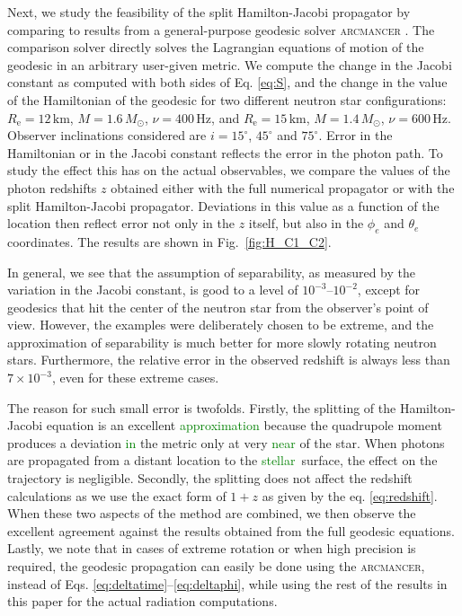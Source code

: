 \documentclass{aa}
\newcommand{\refe}[1]{\textcolor{green}{{#1}}}
\newcommand{\refedel}[1]{}
\newcommand{\Msun}{\ensuremath{M_{\odot}}}
\begin{document}
Next, we study the feasibility of the split Hamilton-Jacobi propagator by comparing to results from a general-purpose geodesic solver \textsc{arcmancer} \citep{PRJ16}.
The comparison solver directly solves the Lagrangian equations of motion of the geodesic in an arbitrary user-given metric. 
We compute the change in the Jacobi constant as computed with both sides of Eq. \eqref{eq:S}, and the change in the value of the Hamiltonian of the geodesic for two different neutron star configurations:
$R_{\mathrm{e}}=12\,\mathrm{km}$, $M=1.6\,\Msun$, $\nu=400\,\mathrm{Hz}$, and $R_{\mathrm{e}}=15\,\mathrm{km}$, $M=1.4\,\Msun$, $\nu=600\,\mathrm{Hz}$.
Observer inclinations considered are $i=15^\circ$, $45^\circ$ and $75^\circ$.
Error in the Hamiltonian or in the Jacobi constant reflects the error in the photon path.
To study the effect this has on the actual observables, we compare the values of the photon redshifts $z$ obtained either with the full numerical propagator or with the split Hamilton-Jacobi propagator.
Deviations in this value as a function of the location then reflect error not only in the $z$ itself, but also in the $\phi_e$ and $\theta_e$ coordinates.
The results are shown in Fig.~\ref{fig:H_C1_C2}. 

In general, we see that the assumption of separability, as measured by the variation in the Jacobi constant, is good to a level of $10^{-3}$--$10^{-2}$, except for geodesics that hit the center of the neutron star from the observer's point of view. 
However, the examples were deliberately chosen to be extreme, and the approximation of separability is much better for more slowly rotating neutron stars.
Furthermore, the relative error in the observed redshift is always less than $7 \times 10^{-3}$, even for these extreme cases.

The reason for such small error is twofolds.
Firstly, the splitting of the Hamilton-Jacobi equation is an excellent \refe{approximation} because the quadrupole moment produces a deviation \refe{in} the metric only at very \refe{near} of the star.
When photons are propagated from a distant location to the \refe{stellar} surface, the effect on the\refedel{ exact} trajectory is negligible.
Secondly, the splitting does not affect the redshift calculations as we use the exact form of $1+z$ as given by the eq. \eqref{eq:redshift}.
When these two aspects of the method are combined, we then observe the excellent agreement against the results obtained from the full geodesic equations.
Lastly, we note that in cases of extreme rotation or when high precision is required, the geodesic propagation can easily be done using the \textsc{arcmancer}, instead of Eqs. \eqref{eq:deltatime}--\eqref{eq:deltaphi}, while using the rest of the results in this paper for the actual radiation computations.
\end{document}
